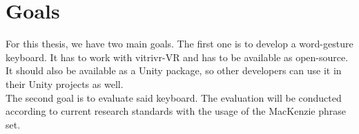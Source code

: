 \section{Goals}
For this thesis, we have two main goals. The first one is to develop a word-gesture keyboard. It has to work with vitrivr-VR and has to be available as open-source. It should also be available as a Unity package, so other developers can use it in their Unity projects as well. \\
The second goal is to evaluate said keyboard. The evaluation will be conducted according to current research standards with the usage of the MacKenzie phrase set.
